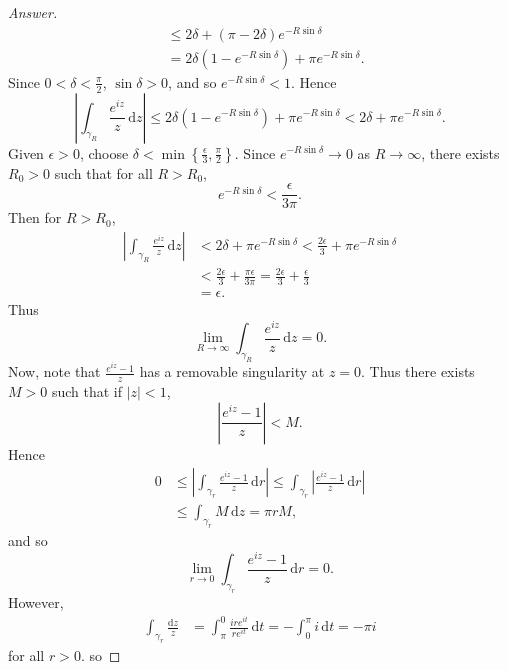 \documentclass[12pt]{article}
\newcommand\paren[1]{\left( #1 \right)}
\newcommand\setb[1]{\left \{ #1 \right \}}
\theoremstyle{definition}
\begin{document}
\begin{enumerate}
\begin{proof}[Answer]
\begin{align*}
            & \leq 2 \delta + \paren{ \pi - 2 \delta } e^{-R \sin \delta } \\
            & = 2 \delta \paren{ 1 - e^{-R \sin \delta} } + \pi e^{-R \sin \delta}.
        \end{align*}
        Since $0 < \delta < \frac{\pi}{2}$, $ \sin \delta > 0$, and so $e^{-R \sin \delta } < 1$. Hence
        \[
            \left| \int_{\gamma_R} \frac{e^{iz}}{z} \, \mathrm{d}z \right| \leq 2 \delta \paren{ 1 - e^{-R \sin \delta} } + \pi e^{-R \sin \delta} < 2 \delta + \pi e^{-R \sin \delta}.
        \]
        Given $\epsilon > 0$, choose $\delta < \min \setb{ \frac{\epsilon}{3} , \frac{\pi}{2} }$. Since $e^{-R \sin \delta} \to 0$ as $R \to \infty$, there exists $R_0 > 0$ such that for all $R > R_0$,
        \[
            e^{-R \sin \delta} < \frac{\epsilon}{3\pi}.
        \]
        Then for $R > R_0$,
        \begin{align*}
            \left| \int_{\gamma_R} \frac{e^{iz}}{z} \, \mathrm{d}z \right| & < 2 \delta + \pi e^{-R \sin \delta} < \frac{2\epsilon}{3} + \pi e^{-R \sin \delta} \\ 
            & < \frac{2\epsilon}{3} + \frac{\pi \epsilon}{3\pi} = \frac{2 \epsilon}{3} + \frac{\epsilon}{3} \\ 
            & = \epsilon.
        \end{align*}
        Thus 
        \[
            \lim\limits_{R \to \infty} \int_{\gamma_R} \frac{e^{iz}}{z} \, \mathrm{d}z = 0.
        \]
        Now, note that $\frac{e^{iz} - 1}{z}$ has a removable singularity at $z = 0$. Thus there exists $M > 0$ such that if $|z| < 1$, 
        \[
            \left| \frac{e^{iz} - 1}{z} \right| < M.
        \]
        Hence
        \begin{align*}
            0 & \leq \left| \int_{\gamma_r} \frac{ e^{iz} - 1 }{ z } \, \mathrm{d}r \right| \leq \int_{\gamma_r} \left| \frac{ e^{iz} - 1 }{ z } \, \mathrm{d}r \right| \\
            & \leq \int_{\gamma_r} M \, \mathrm{d}z = \pi r M,
        \end{align*}
        and so 
        \[
            \lim\limits_{r \to 0} \int_{\gamma_r} \frac{ e^{iz} - 1 }{ z } \, \mathrm{d}r = 0.
        \]
        However, 
        \begin{align*}
            \int_{\gamma_r} \frac{ \mathrm{d}z }{ z } & = \int_{\pi}^0 \frac{ i re^{it} }{ re^{it} } \, \mathrm{d}t = - \int_0^{\pi} i \, \mathrm{d}t = -\pi i
        \end{align*}
        for all $r > 0$. so 

\end{proof}
\end{enumerate}
\end{document}

